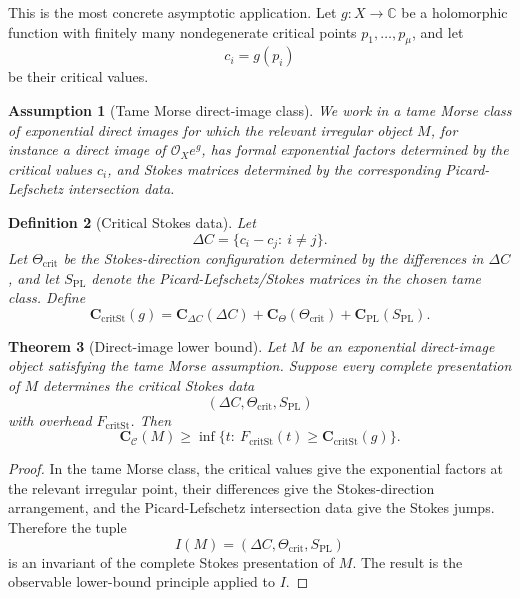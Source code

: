 \documentclass[11pt]{article}
\newtheorem{theorem}{Theorem}[section]
\newtheorem{definition}[theorem]{Definition}
\newtheorem{assumption}[theorem]{Assumption}
\begin{document}
This is the most concrete asymptotic application.  Let \(g:X\to\mathbb C\) be a holomorphic function with finitely many nondegenerate critical points \(p_1,\ldots,p_\mu\), and let
\[
c_i=g(p_i)
\]
be their critical values.

\begin{assumption}[Tame Morse direct-image class]
We work in a tame Morse class of exponential direct images for which the relevant irregular object \(M\), for instance a direct image of \(\mathcal O_X e^g\), has formal exponential factors determined by the critical values \(c_i\), and Stokes matrices determined by the corresponding Picard-Lefschetz intersection data.
\end{assumption}

\begin{definition}[Critical Stokes data]
Let
\[
\Delta C=\{c_i-c_j:\ i\ne j\}.
\]
Let \(\Theta_{\operatorname{crit}}\) be the Stokes-direction configuration determined by the differences in \(\Delta C\), and let \(S_{\operatorname{PL}}\) denote the Picard-Lefschetz/Stokes matrices in the chosen tame class.  Define
\[
\mathbf C_{\operatorname{critSt}}(g)
=
\mathbf C_{\Delta C}(\Delta C)
+
\mathbf C_{\Theta}(\Theta_{\operatorname{crit}})
+
\mathbf C_{\operatorname{PL}}(S_{\operatorname{PL}}).
\]
\end{definition}

\begin{theorem}[Direct-image lower bound]
Let \(M\) be an exponential direct-image object satisfying the tame Morse assumption.  Suppose every complete presentation of \(M\) determines the critical Stokes data
\[
(\Delta C,\Theta_{\operatorname{crit}},S_{\operatorname{PL}})
\]
with overhead \(F_{\operatorname{critSt}}\).  Then
\[
\mathbf C_{\mathcal C}(M)
\ge
\inf\{t:\ F_{\operatorname{critSt}}(t)\ge
\mathbf C_{\operatorname{critSt}}(g)\}.
\]
\end{theorem}

\begin{proof}
In the tame Morse class, the critical values give the exponential factors at the relevant irregular point, their differences give the Stokes-direction arrangement, and the Picard-Lefschetz intersection data give the Stokes jumps.  Therefore the tuple
\[
I(M)=(\Delta C,\Theta_{\operatorname{crit}},S_{\operatorname{PL}})
\]
is an invariant of the complete Stokes presentation of \(M\).  The result is the observable lower-bound principle applied to \(I\).
\end{proof}
\end{document}
